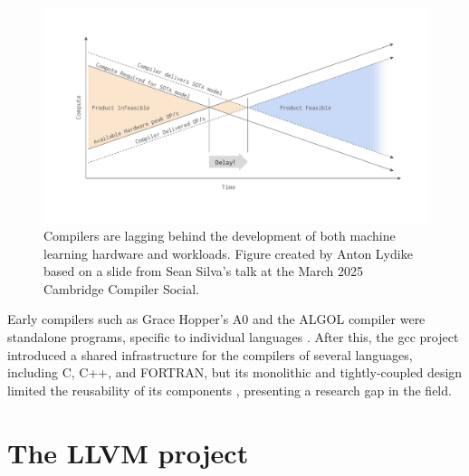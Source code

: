 \begin{figure}[H]
    \centering
    \includegraphics[width=\textwidth]{images/background/compilers_lagging.pdf}
    \caption{Compilers are lagging behind the development of both machine learning hardware and workloads. Figure created by Anton Lydike based on a slide from Sean Silva's talk at the March 2025 Cambridge Compiler Social.}
    \label{fig:compilers-lagging}
\end{figure}

Early compilers such as Grace Hopper's A0 and the ALGOL compiler were standalone programs, specific to individual languages \cite{knuthEarlyDevelopmentProgramming1980}.
After this, the \ac{gcc}  project introduced a shared infrastructure for the compilers of several languages, including C, C++, and FORTRAN, but its monolithic and tightly-coupled design limited the reusability of its components \cite{stallmanUsingGnuCompiler2009}, presenting a research gap in the field.

\section{The LLVM project}
\label{sec:llvm}


